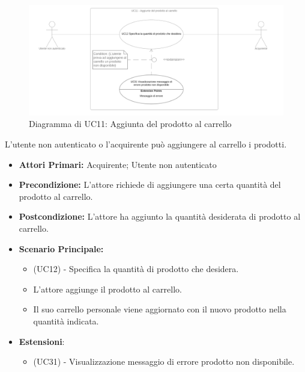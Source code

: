 \begin{figure}[H]
    \centering
    \includegraphics[width=\textwidth]{Immagini/DiagrammiUC/UC11AggiuntaProdottoAlCarrello.png}
    \caption{Diagramma di UC11: Aggiunta del prodotto al carrello} 
    \label{fig:Checkout}
\end{figure}


L'utente non autenticato o l'acquirente può aggiungere al carrello i prodotti.
\begin{itemize}
    \item \textbf{Attori Primari:} Acquirente; Utente non autenticato
    \item \textbf{Precondizione:} L'attore richiede di aggiungere una certa quantità del prodotto al carrello. 
    \item \textbf{Postcondizione:} L'attore ha aggiunto la quantità desiderata di prodotto al carrello.
    \item \textbf{Scenario Principale:} 
    \begin{itemize}
        \item (UC12) - Specifica la quantità di prodotto che desidera.
        \item L'attore aggiunge il prodotto al carrello.
        \item Il suo carrello personale viene aggiornato con il nuovo prodotto nella quantità indicata.
    \end{itemize}
    \item \textbf{Estensioni}:
    \begin{itemize}
        \item (UC31) - Visualizzazione messaggio di errore prodotto non disponibile.
    \end{itemize}
\end{itemize}

